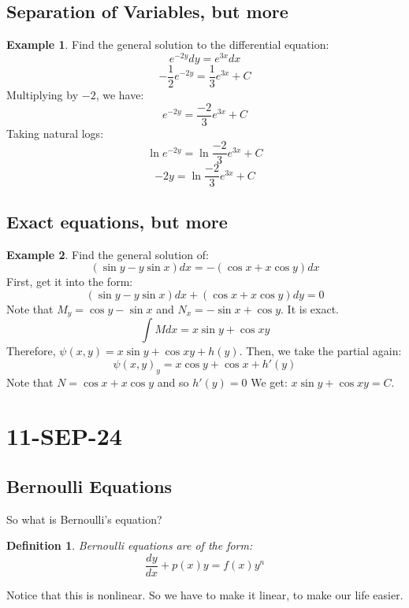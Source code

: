 \documentclass{article}
\newtheorem{defn}{Definition}
\theoremstyle{definition}
\newtheorem{example}{Example}[section]
\begin{document}
\subsection{Separation of Variables, but more}
\begin{example}
    Find the general solution to the differential equation:
    \[e^{-2y}dy = e^{3x}dx \]
    \[-\frac{1}{2}e^{-2y} = \frac{1}{3}e^{3x} + C \]
    Multiplying by $-2$, we have:
    \[e^{-2y} = \frac{-2}{3}e^{3x} + C \]
    Taking natural logs:
    \[\ln{e^{-2y}} = \ln{\frac{-2}{3}e^{3x} + C} \]
    \[ -2y = \ln{\frac{-2}{3}e^{3x} + C} \]
\end{example}
\subsection{Exact equations, but more}
\begin{example}
    Find the general solution of:
    \[(\sin{y} - y\sin{x})dx = -(\cos{x} + x\cos{y})dx \]
First, get it into the form:
    \[(\sin{y} - y\sin{x})dx + (\cos{x} + x\cos{y})dy = 0 \]
    Note that $M_y = \cos{y}-\sin{x}$ and $N_x = -\sin{x} + \cos{y}$. It is exact. 
\[ \int{M dx} = x\sin{y} +\cos{x}y \]
Therefore, $\psi(x,y) = x\sin{y} +\cos{x}y + h(y)$. Then, we take the partial again:
\[{\psi(x,y)}_y = x\cos{y} + \cos{x} + h'(y) \]
Note that $N = \cos{x} + x\cos{y}$ and so $h'(y) = 0$
We get: $x\sin{y} +\cos{x}y = C$. 
\end{example}

\section{11-SEP-24}
\subsection{Bernoulli Equations}
So what is Bernoulli's equation?
\begin{defn}
Bernoulli equations are of the form:
\[
\frac{dy}{dx} + p(x)y = f(x)y^n
\]
\end{defn}
Notice that this is nonlinear. So we have to make it linear, to make our life easier.
\end{document}
